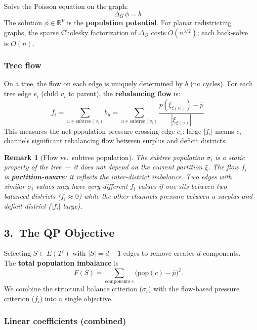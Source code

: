 \documentclass[11pt]{article}
\newcommand{\R}{\mathbb{R}}
\newcommand{\pbar}{\bar{p}}
\newtheorem{remark}{Remark}
\begin{document}
Solve the Poisson equation on the graph:
\[
  \Delta_G\, \phi = b.
\]
The solution $\phi \in \R^V$ is the \textbf{population potential}. For
planar redistricting graphs, the sparse Cholesky factorization of $\Delta_G$
costs $O(n^{3/2})$; each back-solve is $O(n)$.

\subsubsection*{Tree flow}

On a tree, the flow on each edge is uniquely determined by $b$ (no cycles).
For each tree edge $e_i$ (child $v_i$ to parent), the
\textbf{rebalancing flow} is:
\[
  f_i = \sum_{u \in \mathrm{subtree}(v_i)} b_u
  = \sum_{u \in \mathrm{subtree}(v_i)}
    \frac{p(\xi_{\xi(u)}) - \pbar}{|\xi_{\xi(u)}|}.
\]
This measures the net population pressure crossing edge $e_i$: large $|f_i|$
means $e_i$ channels significant rebalancing flow between surplus and deficit
districts.

\begin{remark}[Flow vs.\ subtree population]
The subtree population $\sigma_i$ is a static property of the tree --- it does
not depend on the current partition $\xi$. The flow $f_i$ is
\textbf{partition-aware}: it reflects the inter-district imbalance. Two edges
with similar $\sigma_i$ values may have very different $f_i$ values if one
sits between two balanced districts ($f_i \approx 0$) while the other channels
pressure between a surplus and deficit district ($|f_i|$ large).
\end{remark}


\subsection*{3.\ The QP Objective}

Selecting $S \subset E(T')$ with $|S| = d - 1$ edges to remove creates
$d$ components. The \textbf{total population imbalance} is
\[
  F(S) = \sum_{\text{components } c} \bigl(\mathrm{pop}(c) - \pbar\bigr)^2.
\]
We combine the structural balance criterion ($\sigma_i$) with the
flow-based pressure criterion ($f_i$) into a single objective.

\subsubsection*{Linear coefficients (combined)}
\end{document}
